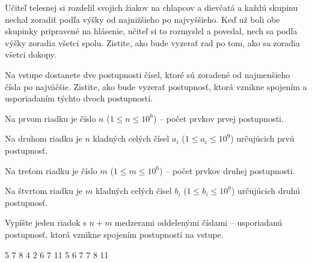 




Učiteľ telesnej si rozdelil svojich žiakov na chlapcov a dievčatá a každú
skupinu nechal zoradiť podľa výšky od najnižšieho po najvyššieho. Keď už boli
obe skupinky pripravené na hlásenie, učiteľ si to rozmyslel a povedal, nech sa
podľa výšky zoradia všetci spolu. Zistite, ako bude vyzerať rad po tom, ako sa
zoradia všetci dokopy.


Na vstupe dostanete dve postupnosti čísel, ktoré sú zoradené od najmenšieho
čísla po najväčšie.  Zistite, ako bude vyzerať postupnosť, ktorá vznikne
spojením a usporiadaním týchto dvoch postupností.


Na prvom riadku je číslo $n$ ($1 \leq n \leq 10^6$) -- počet prvkov prvej
postupnosti.

Na druhom riadku je $n$ kladných celých čísel $a_i$ ($1 \leq a_i \leq 10^9$)
určujúcich prvú postupnosť.

Na treťom riadku je číslo $m$ ($1 \leq m \leq 10^6$) -- počet prvkov druhej
postupnosti.

Na štvrtom riadku je $m$ kladných celých čísel $b_i$ ($1 \leq b_i \leq 10^9$)
určujúcich druhú postupnosť.


Vypíšte jeden riadok s $n+m$ medzerami oddelenými číslami -- usporiadanú
postupnosť, ktorá vznikne spojením postupností na vstupe.


5 7 8
4
2 6 7 11
 5 6 7 7 8 11
\koniec


